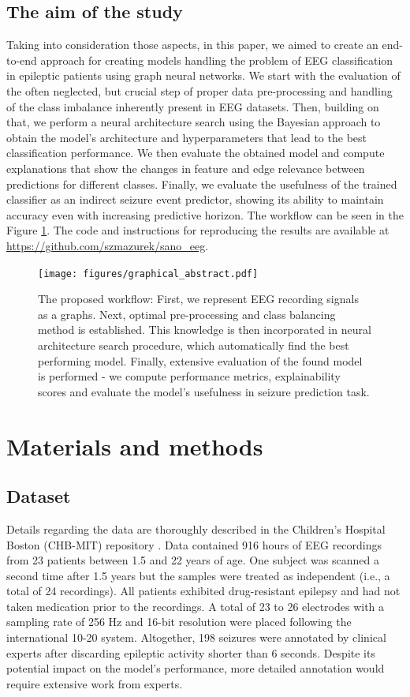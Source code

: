 \documentclass[a4paper,fleqn]{cas-sc}
\begin{document}
\subsection{The aim of the study}
Taking into consideration those aspects, 
in this paper, we aimed to create an end-to-end approach for creating models handling the problem of EEG classification in epileptic patients using graph neural networks. We start with the evaluation of the often neglected, but crucial step of proper data pre-processing and handling of the class imbalance inherently present in EEG datasets. Then, building on that, we perform a neural architecture search using the Bayesian approach to obtain the model's architecture and hyperparameters that lead to the best classification performance. We then evaluate the obtained model and compute explanations that show the changes in feature and edge relevance between predictions for different classes. Finally, we evaluate the usefulness of the trained classifier as an indirect seizure event predictor, showing its ability to maintain accuracy even with increasing predictive horizon.  The workflow can be seen in the Figure \ref{fig:graphical-abstract}.
The code and instructions for reproducing the results are available at \url{https://github.com/szmazurek/sano_eeg}.

\begin{figure}[!h]
    \centering
    \texttt{[image: figures/graphical\_abstract.pdf]}
    \caption{The proposed workflow: First, we represent EEG recording signals as a graphs. Next, optimal pre-processing and class balancing method is established. This knowledge is then incorporated in neural architecture search procedure, which automatically find the best performing model. Finally, extensive evaluation of the found model is performed -  we compute performance metrics, explainability scores and evaluate the model's usefulness in seizure prediction task.}
    \label{fig:graphical-abstract}
\end{figure}

\section{Materials and methods}

\subsection{Dataset}
Details regarding the data are thoroughly described in the Children's Hospital Boston (CHB-MIT) repository \cite{ShoebChbmit}. Data contained 916 hours of EEG recordings from 23 patients between 1.5 and 22 years of age. One subject was scanned a second time after 1.5 years but the samples were treated as independent (i.e., a total of 24 recordings). All patients exhibited drug-resistant epilepsy and had not taken medication prior to the recordings. A total of 23 to 26 electrodes with a sampling rate of 256 Hz and 16-bit resolution were placed following the international 10-20 system. Altogether, 198 seizures were annotated by clinical experts after discarding epileptic activity shorter than 6 seconds. Despite its potential impact on the model's performance, more detailed annotation would require extensive work from experts. 
\end{document}
